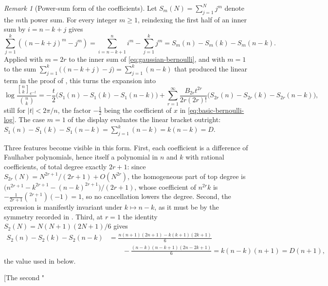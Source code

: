 \documentclass[11pt,oneside,openany]{book}
\theoremstyle{definition}
\theoremstyle{remark}
\newtheorem{remark}[remark]{Remark}
\newcommand{\Qbinom}[3]{\genfrac{[}{]}{0pt}{}{#1}{#2}_{#3}}
\newcommand{\abs}[1]{\lvert #1\rvert}
\begin{document}
\begin{remark}[Power-sum form of the coefficients]
Let $S_m(N)=\sum_{j=1}^{N}j^{m}$ denote the $m$th power sum.  For every integer $m\ge1$, reindexing the first half of an inner sum by $i=n-k+j$ gives
\[
 \sum_{j=1}^{k}\left((n-k+j)^{m}-j^{m}\right)
 =\sum_{i=n-k+1}^{n}i^{m}-\sum_{j=1}^{k}j^{m}
 =S_{m}(n)-S_{m}(k)-S_{m}(n-k).
\]
Applied with $m=2r$ to the inner sum of \eqref{eq:gaussian-bernoulli}, and with $m=1$ to the sum $\sum_{j=1}^{k}\bigl((n-k+j)-j\bigr)=\sum_{j=1}^{k}(n-k)$ that produced the linear term in the proof of , this turns the expansion into
\[
 \log\frac{\Qbinom nk{e^{-t}}}{\binom nk}
 =-\frac t2\bigl(S_1(n)-S_1(k)-S_1(n-k)\bigr)
 +\sum_{r=1}^{\infty}\frac{B_{2r}t^{2r}}{2r(2r)!}
 \bigl(S_{2r}(n)-S_{2r}(k)-S_{2r}(n-k)\bigr),
\]
still for $\abs t<2\pi/n$, the factor $-\tfrac12$ being the coefficient of $x$ in \eqref{eq:basic-bernoulli-log}.  The case $m=1$ of the display evaluates the linear bracket outright: $S_1(n)-S_1(k)-S_1(n-k)=\sum_{j=1}^{k}(n-k)=k(n-k)=D$.

Three features become visible in this form.  First, each coefficient is a difference of Faulhaber polynomials, hence itself a polynomial in $n$ and $k$ with rational coefficients, of total degree exactly $2r+1$: since $S_{2r}(N)=N^{2r+1}/(2r+1)+O(N^{2r})$, the homogeneous part of top degree is $\bigl(n^{2r+1}-k^{2r+1}-(n-k)^{2r+1}\bigr)/(2r+1)$, whose coefficient of $n^{2r}k$ is $-\tfrac1{2r+1}\binom{2r+1}{1}(-1)=1$, so no cancellation lowers the degree.  Second, the expression is manifestly invariant under $k\mapsto n-k$, as it must be by the symmetry recorded in .  Third, at $r=1$ the identity $S_2(N)=N(N+1)(2N+1)/6$ gives
\begin{align*}
 S_2(n)-S_2(k)-S_2(n-k)
 &=\frac{n(n+1)(2n+1)-k(k+1)(2k+1)}{6}\\
 &\qquad-\frac{(n-k)(n-k+1)(2n-2k+1)}{6}
 =k(n-k)(n+1)=D(n+1),
\end{align*}
the value used in  below.
\end{remark}


[The second "%
\end{document}
